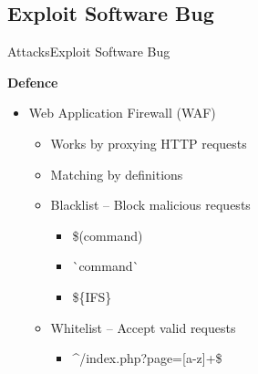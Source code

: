 \subsection{Exploit Software Bug}
\begin{frame}{Attacks}{Exploit Software Bug}

\textbf{Defence}
\begin{itemize}
	\item Web Application Firewall (WAF)
	\begin{itemize}
		\item Works by proxying HTTP requests
		\item Matching by definitions 
		\item Blacklist -- Block malicious requests
		\begin{itemize}
			\item \$(command)
			\item \`{}command\`{}
			\item \$\{IFS\}
		\end{itemize}
		\item Whitelist -- Accept valid requests
		\begin{itemize}
			\item \string^{}/index.php?page=[a-z]+\$
		\end{itemize}
	\end{itemize}
\end{itemize}

	

	

\end{frame}
